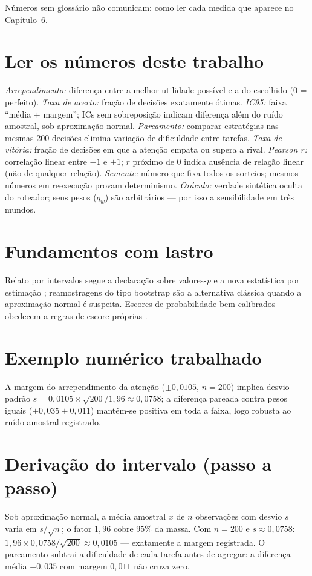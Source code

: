 Números sem glossário não comunicam: como ler cada medida que aparece no Capítulo~6.
\section{Ler os números deste trabalho}
\textit{Arrependimento:} diferença entre a melhor utilidade possível e a do escolhido (0 = perfeito). \textit{Taxa de acerto:} fração de decisões exatamente ótimas. \textit{IC95:} faixa ``média $\pm$ margem''; ICs sem sobreposição indicam diferença além do ruído amostral, sob aproximação normal. \textit{Pareamento:} comparar estratégias nas mesmas 200 decisões elimina variação de dificuldade entre tarefas. \textit{Taxa de vitória:} fração de decisões em que a atenção empata ou supera a rival. \textit{Pearson $r$:} correlação linear entre $-1$ e $+1$; $r$ próximo de 0 indica ausência de relação linear (não de qualquer relação). \textit{Semente:} número que fixa todos os sorteios; mesmos números em reexecução provam determinismo. \textit{Oráculo:} verdade sintética oculta do roteador; seus pesos ($q_w$) são arbitrários --- por isso a sensibilidade em três mundos.
\section{Fundamentos com lastro}
Relato por intervalos segue a declaração sobre valores-\textit{p} \cite{wasserstein2016} e a nova estatística por estimação \cite{cumming2014}; reamostragens do tipo bootstrap \cite{efron1979} são a alternativa clássica quando a aproximação normal é suspeita. Escores de probabilidade bem calibrados obedecem a regras de escore próprias \cite{gneiting2007}.
\section{Exemplo numérico trabalhado}
A margem do arrependimento da atenção ($\pm0{,}0105$, $n=200$) implica desvio-padrão $s=0{,}0105\times\sqrt{200}/1{,}96\approx0{,}0758$; a diferença pareada contra pesos iguais ($+0{,}035\pm0{,}011$) mantém-se positiva em toda a faixa, logo robusta ao ruído amostral registrado.
\section{Derivação do intervalo (passo a passo)}
Sob aproximação normal, a média amostral $\bar{x}$ de $n$ observações com desvio $s$ varia em $s/\sqrt{n}$; o fator $1{,}96$ cobre $95\%$ da massa. Com $n=200$ e $s\approx0{,}0758$: $1{,}96\times0{,}0758/\sqrt{200}\approx0{,}0105$ --- exatamente a margem registrada. O pareamento subtrai a dificuldade de cada tarefa antes de agregar: a diferença média $+0{,}035$ com margem $0{,}011$ não cruza zero.
